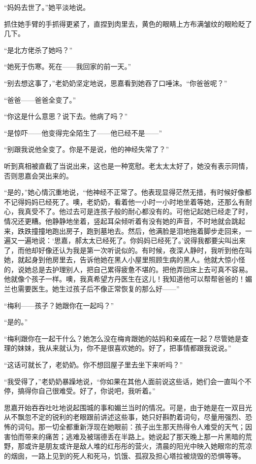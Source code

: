 \par “妈妈去世了。”她平淡地说。
\par 抓住她手臂的手抓得更紧了，直捏到肉里去，黄色的眼睛上方布满皱纹的眼睑眨了几下。
\par “是北方佬杀了她吗？”
\par “她死于伤寒。死在——我回家的前一天。”
\par “别去想这事了，”老奶奶坚定地说，思嘉看到她吞了口唾沫。“你爸爸呢？”
\par “爸爸——爸爸全变了。”
\par “你这是什么意思？说下去。他病了吗？”
\par “是惊吓——他变得完全陌生了——他已经不是——”
\par “别跟我说他全变了。你是不是说，他的神经失常了？”
\par 听到真相被直截了当说出来，这也是一种宽慰。老太太太好了，她没有表示同情，否则思嘉会哭出来的。
\par “是的，”她心情沉重地说，“他神经不正常了。他表现显得茫然无措，有时候好像都不记得妈妈已经死了。噢，老奶奶，看着他一小时一小时地坐着等她，还那么有耐心，我真受不了。他过去可是连孩子般的耐心都没有的。可他记起她已经走了时，情况还更糟。他静静地坐着，竖起耳朵倾听着有没有她的声音，不时地就会跳起来，跌跌撞撞地跑出房子，跑到墓地去。然后，他满脸是泪地拖着脚步走回来，一遍又一遍地说：‘思嘉，郝太太已经死了。你妈妈已经死了。’说得我都要尖叫出来了，而他却好像还认为我是第一次听说似的。有时候，夜深人静时，我听到他在叫她，就起身到他房里去，告诉他她在黑人小屋里照顾生病的黑人。他就大惊小怪的，说她总是去护理别人，把自己累得疲惫不堪的。把他弄回床上去可真不容易。他就像个孩子一样。噢，我真希望方丹医生在这儿！我知道他可以帮帮爸爸的！媚兰也需要医生。她生过孩子后不像正常恢复的那么好——”
\par “梅利——孩子？她跟你在一起吗？”
\par “是的。”
\par “梅利跟你在一起干什么？她怎么没在梅肯跟她的姑妈和亲戚在一起？尽管她是查理的妹妹，我从来就认为，你不是很喜欢她的。好了，把事情都跟我说说。”
\par “这话可就长了，老奶奶。你不想回屋子里去坐下来听吗？”
\par “我受得了，”老奶奶暴躁地说，“你如果在其他人面前说这些话，她们会一直叫个不停，搞得你自己很难受。好了，你说吧，我听着。”
\par 思嘉开始吞吞吐吐地说起围城的事和媚兰当时的情况。可是，由于她是在一双目光从不飘忽不定的锐利的老眼跟前讲述这些事，她只好斟酌着词句，尽量用强烈、恐怖的词句。那一切全都重新浮现在她眼前：孩子出生那天热得令人难受的天气；因害怕而带来的痛苦；逃难及被瑞德丢在半路上。她说起了那天晚上那一片黑暗的荒野，那或许是朋友或许是敌人堆的红彤彤的营火，清晨的阳光中映入她眼帘的荒凉的烟囱，一路上见到的死人和死马，饥饿、孤寂及担心塔拉被烧毁的恐惧等等。
